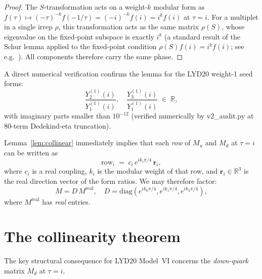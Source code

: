 \documentclass[a4paper,11pt]{article}
\newcommand{\tauCM}{\tau = i}
\newcommand{\Md}{M_d}
\newcommand{\Mu}{M_u}
\begin{document}
\begin{proof}
The $S$-transformation acts on a weight-$k$ modular form as
$f(\tau)\mapsto (-\tau)^{-k}f(-1/\tau) = (-i)^{-k}f(i) = i^k f(i)$
at $\tau=i$.  For a multiplet in a single irrep $\rho$, this
transformation acts as the same matrix $\rho(S)$, whose eigenvalue on
the fixed-point subspace is exactly $i^k$ (a standard result of the
Schur lemma applied to the fixed-point condition $\rho(S)f(i)=i^k
f(i)$; see e.g.~\cite{dMVP26}).  All components therefore carry the
same phase.
\end{proof}

\noindent
A direct numerical verification confirms the lemma for the LYD20
weight-1 seed forms:
\begin{equation}
  \frac{Y_2^{(1)}(i)}{Y_1^{(1)}(i)},\quad
  \frac{Y_3^{(1)}(i)}{Y_1^{(1)}(i)} \;\in\; \mathbb{R},
\end{equation}
with imaginary parts smaller than $10^{-12}$ (verified numerically
by v2\_audit.py at 80-term Dedekind-eta truncation).

Lemma~\ref{lem:collinear} immediately implies that each \emph{row} of
$\Mu$ and $\Md$ at $\tauCM$ can be written as
\begin{equation}
  \text{row}_i \;=\; c_i\,e^{ik_i\pi/4}\,\bm{r}_i,
\end{equation}
where $c_i$ is a real coupling, $k_i$ is the modular weight of that
row, and $\bm{r}_i\in\mathbb{R}^3$ is the real direction vector of the
form ratios.  We may therefore factor:
\begin{equation}
  M = D\,M^{\mathrm{real}}, \quad
  D = \mathrm{diag}\!\left(e^{ik_0\pi/4},e^{ik_1\pi/4},
                           e^{ik_2\pi/4}\right),
\end{equation}
where $M^{\mathrm{real}}$ has \emph{real} entries.

\section{The collinearity theorem}
\label{sec:collinear}

The key structural consequence for LYD20 Model~VI concerns the
\emph{down-quark} matrix $\Md$ at $\tau=i$.
\end{document}
